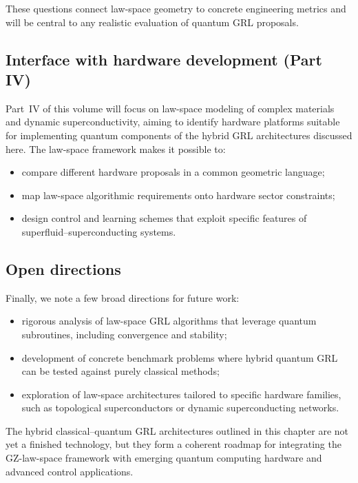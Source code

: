 \documentclass[11pt]{book}
\theoremstyle{plain}
\theoremstyle{definition}
\theoremstyle{remark}
\begin{document}
These questions connect law-space geometry to concrete engineering
metrics and will be central to any realistic evaluation of quantum
GRL proposals.

\subsection*{Interface with hardware development (Part IV)}

Part~IV of this volume will focus on law-space modeling of complex
materials and dynamic superconductivity, aiming to identify hardware
platforms suitable for implementing quantum components of the
hybrid GRL architectures discussed here. The law-space framework
makes it possible to:
\begin{itemize}
  \item compare different hardware proposals in a common geometric
        language;
  \item map law-space algorithmic requirements onto hardware
        sector constraints;
  \item design control and learning schemes that exploit specific
        features of \\superfluid–superconducting systems.
\end{itemize}

\subsection*{Open directions}

Finally, we note a few broad directions for future work:

\begin{itemize}
  \item rigorous analysis of law-space GRL algorithms that leverage
        quantum subroutines, including convergence and stability;
  \item development of concrete benchmark problems where hybrid
        quantum GRL can be tested against purely classical methods;
  \item exploration of law-space architectures tailored to specific
        hardware families, such as topological superconductors or
        dynamic superconducting networks.
\end{itemize}

The hybrid classical–quantum GRL architectures outlined in this
chapter are not yet a finished technology, but they form a coherent
roadmap for integrating the GZ-law-space framework with emerging
quantum computing hardware and advanced control applications.
\end{document}
